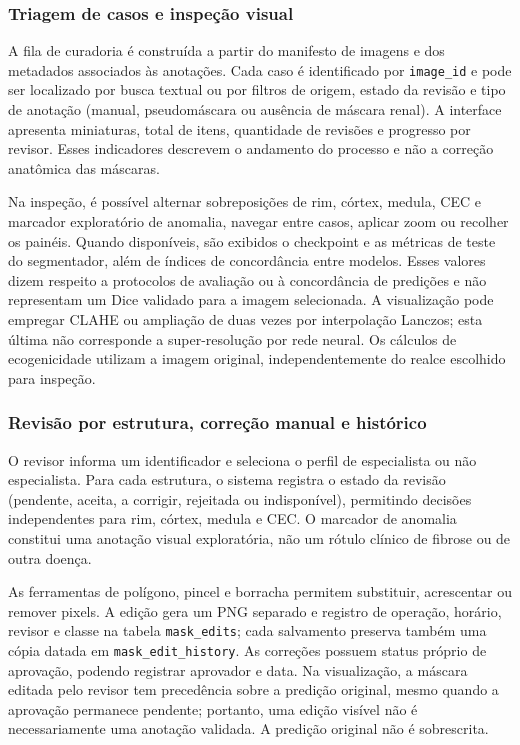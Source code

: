 \documentclass[12pt]{article}
\begin{document}
\subsubsection{Triagem de casos e inspeção visual}
\label{sec:curadoria_triagem}

A fila de curadoria é construída a partir do manifesto de imagens e dos metadados associados às anotações. Cada caso é identificado por \texttt{image\_id} e pode ser localizado por busca textual ou por filtros de origem, estado da revisão e tipo de anotação (manual, pseudomáscara ou ausência de máscara renal). A interface apresenta miniaturas, total de itens, quantidade de revisões e progresso por revisor. Esses indicadores descrevem o andamento do processo e não a correção anatômica das máscaras.

Na inspeção, é possível alternar sobreposições de rim, córtex, medula, CEC e marcador exploratório de anomalia, navegar entre casos, aplicar zoom ou recolher os painéis. Quando disponíveis, são exibidos o checkpoint e as métricas de teste do segmentador, além de índices de concordância entre modelos. Esses valores dizem respeito a protocolos de avaliação ou à concordância de predições e não representam um Dice validado para a imagem selecionada. A visualização pode empregar CLAHE ou ampliação de duas vezes por interpolação Lanczos; esta última não corresponde a super-resolução por rede neural. Os cálculos de ecogenicidade utilizam a imagem original, independentemente do realce escolhido para inspeção.

\subsubsection{Revisão por estrutura, correção manual e histórico}
\label{sec:curadoria_revisao}

O revisor informa um identificador e seleciona o perfil de especialista ou não especialista. Para cada estrutura, o sistema registra o estado da revisão (pendente, aceita, a corrigir, rejeitada ou indisponível), permitindo decisões independentes para rim, córtex, medula e CEC. O marcador de anomalia constitui uma anotação visual exploratória, não um rótulo clínico de fibrose ou de outra doença.

As ferramentas de polígono, pincel e borracha permitem substituir, acrescentar ou remover pixels. A edição gera um PNG separado e registro de operação, horário, revisor e classe na tabela \texttt{mask\_edits}; cada salvamento preserva também uma cópia datada em \texttt{mask\_edit\_history}. As correções possuem status próprio de aprovação, podendo registrar aprovador e data. Na visualização, a máscara editada pelo revisor tem precedência sobre a predição original, mesmo quando a aprovação permanece pendente; portanto, uma edição visível não é necessariamente uma anotação validada. A predição original não é sobrescrita.
\end{document}
